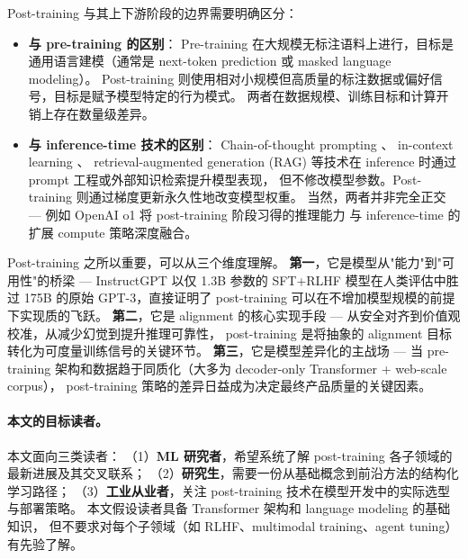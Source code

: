 \noindent
Post-training 与其上下游阶段的边界需要明确区分：

\begin{itemize}[leftmargin=2em]
  \item \textbf{与 pre-training 的区别}：
    Pre-training 在大规模无标注语料上进行，目标是通用语言建模（通常是 next-token prediction 或 masked language modeling）。
    Post-training 则使用相对小规模但高质量的标注数据或偏好信号，目标是赋予模型特定的行为模式。
    两者在数据规模、训练目标和计算开销上存在数量级差异。

  \item \textbf{与 inference-time 技术的区别}：
    Chain-of-thought prompting \cite{wei2022cot}、
    in-context learning \cite{brown2020gpt3}、
    retrieval-augmented generation (RAG) \cite{lewis2020rag}
    等技术在 inference 时通过 prompt 工程或外部知识检索提升模型表现，
    但不修改模型参数。Post-training 则通过梯度更新永久性地改变模型权重。
    当然，两者并非完全正交 ---
    例如 OpenAI o1 \cite{openai2024o1} 将 post-training 阶段习得的推理能力
    与 inference-time 的扩展 compute 策略深度融合。
\end{itemize}

\noindent
Post-training 之所以重要，可以从三个维度理解。
\textbf{第一}，它是模型从"能力"到"可用性"的桥梁 ---
InstructGPT \cite{ouyang2022instructgpt} 以仅 1.3B 参数的 SFT+RLHF 模型在人类评估中胜过
175B 的原始 GPT-3，直接证明了 post-training 可以在不增加模型规模的前提下实现质的飞跃。
\textbf{第二}，它是 alignment 的核心实现手段 ---
从安全对齐到价值观校准，从减少幻觉到提升推理可靠性，
post-training 是将抽象的 alignment 目标转化为可度量训练信号的关键环节。
\textbf{第三}，它是模型差异化的主战场 ---
当 pre-training 架构和数据趋于同质化（大多为 decoder-only Transformer + web-scale corpus），
post-training 策略的差异日益成为决定最终产品质量的关键因素。

\paragraph{本文的目标读者。}
本文面向三类读者：
（1）\textbf{ML 研究者}，希望系统了解 post-training 各子领域的最新进展及其交叉联系；
（2）\textbf{研究生}，需要一份从基础概念到前沿方法的结构化学习路径；
（3）\textbf{工业从业者}，关注 post-training 技术在模型开发中的实际选型与部署策略。
本文假设读者具备 Transformer 架构和 language modeling 的基础知识，
但不要求对每个子领域（如 RLHF、multimodal training、agent tuning）有先验了解。

